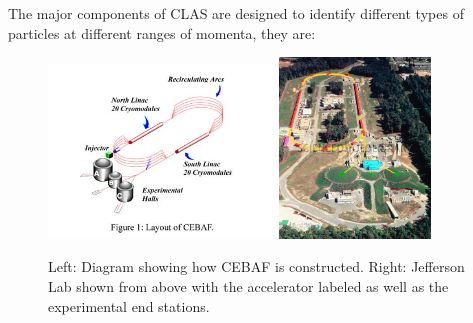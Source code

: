 The major components of CLAS \cite{clas} are designed to identify different types of particles at different ranges of momenta, they are:

\begin{figure}
  \centering
  \includegraphics[width=6cm]{image/cebaf.jpg}
  \includegraphics[width=4cm]{image/jlab-photo.jpg}
  \caption{ Left: Diagram showing how CEBAF is constructed.  Right: Jefferson Lab shown from above with the accelerator labeled as well as the experimental end stations.}
  \label{fig:jlab}
\end{figure}

